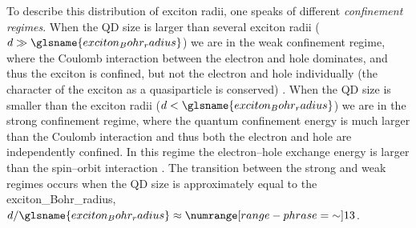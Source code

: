 \documentclass[draft,webedition,openright,titles,swedish,english]{LuaUUThesis}\usepackage[]{graphicx}\usepackage[]{xcolor}
\begin{document}
To describe this distribution of exciton radii, one speaks of different
\emph{confinement regimes}.
When the \gls{QD} size is larger than several exciton radii ($d\gg\glsname{exciton_Bohr_radius}$)
we are in the weak confinement regime, where the Coulomb interaction between the electron
and hole dominates, and thus the exciton is confined, but not the electron and hole
individually (the character of the exciton as a quasiparticle is conserved) \cite{Kayanuma1988}.
%
When the \gls{QD} size is smaller than the exciton radii ($d<\glsname{exciton_Bohr_radius}$)
we are in the strong confinement regime,
where the quantum confinement energy is much larger than the Coulomb interaction
and thus both the electron and hole are independently confined.
In this regime the electron--hole exchange energy is larger than
the spin--orbit interaction \cite[p.\ 115]{Delerue2004}.
%
The transition between the strong and weak regimes occurs when the \gls{QD} size
is approximately equal to the \gls{exciton_Bohr_radius},
$d/\glsname{exciton_Bohr_radius}\approx\numrange[range-phrase={\ensuremath{\sim}}]{1}{3}$.
\end{document}
